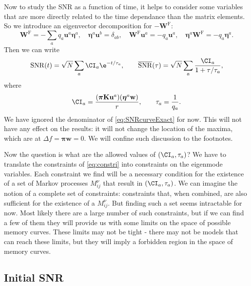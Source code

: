 \documentclass[12pt]{article}
\newcommand{\eqm}{\pi}
\newcommand{\eq}{\boldsymbol{\eqm}}
\newcommand{\wm}{w}
\newcommand{\w}{\mathbf{\wm}}
\newcommand{\Wm}{W}
\newcommand{\W}{\mathbf{\Wm}}
\newcommand{\MMdm}{M}
\newcommand{\encm}{K}
\newcommand{\enc}{\mathbf{\encm}}
\newcommand{\frg}{\W^{\mathrm{F}}}
\newcommand{\evrm}{u}
\newcommand{\evr}{\mathbf{\evrm}}
\newcommand{\evlm}{\eta}
\newcommand{\evl}{\boldsymbol{\evlm}}
\DeclareMathOperator{\snr}{SNR}
\newcommand{\snrb}{\overline{\snr}}
\begin{document}
Now to study the SNR as a function of  time, it helps to consider some variables that are more directly related to the time dependance than the matrix elements. 
So we introduce an eigenvector decomposition for \(-\frg\):
%
\begin{equation}\label{eq:eigendecomp}
  \frg = - \sum_a q_a \evr^a \evl^a,
  \quad
  \evl^a \evr^b = \delta_{ab},
  \quad
  \frg \evr^a = -q_a \evr^a,
  \quad
  \evl^a \frg = -q_a \evl^a.
\end{equation}
%
Then we can write
%
\begin{equation}\label{eq:snreig}
  \snr(t) = \sqrt{N}\sum_a \CI_a \e^{-t/\tau_a},
  \qquad
  \snrb(\tau) = \sqrt{N}\sum_a \frac{\CI_a}{1+\tau/\tau_a},
\end{equation}
%
where
%
\begin{equation}\label{eq:snrcoeffs}
  \CI_a = \frac{(\eq \enc \evr^a) (\evl^a \w)}{r},
  \qquad
  \tau_a = \frac{1}{q_a}.
\end{equation}
%
We have ignored the denominator of \cref{eq:SNRcurveExact} for now.
This will not have any effect on the results: it will not change the location of the maxima, which are at \( \Delta f = \eq \w = 0 \).
We will confine such discussion to the footnotes.

Now the question is what are the allowed values of \( (\CI_a, \tau_a) \)?
We have to translate the constraints of \cref{eq:constri} into constraints on the eigenmode variables.
Each constraint we find will be a necessary condition for the existence of a set of Markov processes \( \MMdm_{ij}^\nu \) that result in \( (\CI_a, \tau_a) \).
We can imagine the notion of a complete set of constraints: constraints that, when combined, are also sufficient for the existence of a \( \MMdm_{ij}^\nu \).
But finding such a set seems intractable for now.
Most likely there are a large number of such constraints, but if we can find a few of them they will provide us with some limits on the space of possible memory curves.
These limits may not be tight - there may not be models that can reach these limits, but they will imply a forbidden region in the space of memory curves.



\subsection{Initial SNR}\label{sec:initial}
\end{document}
